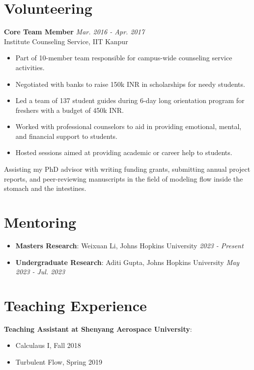 \documentclass[11pt]{article}
\begin{document}


\section*{Volunteering}

\noindent\textbf{Core Team Member} \hfill \textit{Mar. 2016 - Apr. 2017} \\
Institute Counseling Service, IIT Kanpur
\begin{itemize}[leftmargin=*,itemsep=1pt]
    \item Part of 10-member team responsible for campus-wide counseling service activities.
    \item Negotiated with banks to raise 150k INR in scholarships for needy students.
    \item Led a team of 137 student guides during 6-day long orientation program for freshers with a budget of 450k INR.
    \item Worked with professional counselors to aid in providing emotional, mental, and financial support to students.
    \item Hosted sessions aimed at providing academic or career help to students.
\end{itemize}

\vspace{4mm}

\noindent Assisting my PhD advisor with writing funding grants, submitting annual project reports, and peer-reviewing manuscripts in the field of modeling flow inside the stomach and the intestines.

\vspace{6mm}

\section*{Mentoring}

\begin{itemize}[leftmargin=*,itemsep=1pt]
    \item \textbf{Masters Research}: Weixuan Li, Johns Hopkins University \hfill \textit{2023 - Present}
    \item \textbf{Undergraduate Research}: Aditi Gupta, Johns Hopkins University \hfill \textit{May 2023 - Jul. 2023}
\end{itemize}

\vspace{6mm}

\section*{Teaching Experience}

\noindent\textbf{Teaching Assistant at Shenyang Aerospace University}:
\begin{itemize}[leftmargin=*,itemsep=1pt]
    \item Calculaus I, Fall 2018
    \item Turbulent Flow, Spring 2019
\end{itemize}
\end{document}
